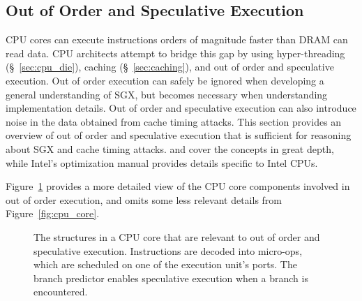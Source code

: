 \subsection{Out of Order and Speculative Execution}
\label{sec:out_of_order}

CPU cores can execute instructions orders of magnitude faster than DRAM can
read data. CPU architects attempt to bridge this gap by using hyper-threading
(\S~\ref{sec:cpu_die}), caching (\S~\ref{sec:caching}), and out of order and
speculative execution. Out of order execution can safely be ignored when
developing a general understanding of SGX, but becomes necessary when
understanding implementation details. Out of order and speculative execution
can also introduce noise in the data obtained from cache timing attacks. This
section provides an overview of out of order and speculative execution that is
sufficient for reasoning about SGX and cache timing attacks.
\cite{patterson2013architecture} and \cite{hennessy2012architecture} cover the
concepts in great depth, while Intel's optimization manual
\cite{intel2014optimization} provides details specific to Intel CPUs.


Figure~\ref{fig:cpu_out_of_order} provides a more detailed view of the CPU core
components involved in out of order execution, and omits some less relevant
details from Figure~\ref{fig:cpu_core}.

\begin{figure}[hbt]
  \caption{
    The structures in a CPU core that are relevant to out of order and
    speculative execution. Instructions are decoded into micro-ops, which are
    scheduled on one of the execution unit's ports. The branch predictor
    enables speculative execution when a branch is encountered.
  }
  \label{fig:cpu_out_of_order}
\end{figure}

